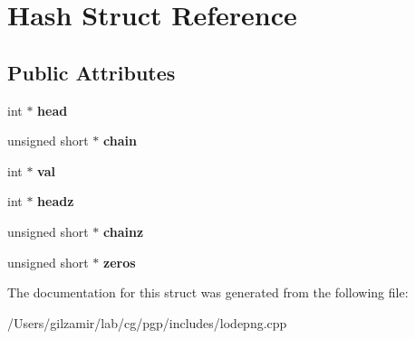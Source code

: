 \hypertarget{struct_hash}{}\section{Hash Struct Reference}
\label{struct_hash}
\subsection*{Public Attributes}
\begin{DoxyCompactItemize}
\item 
\mbox{\label{struct_hash_a0977cf12b1d8e6bbc784b5e0877926f5}} 
int $\ast$ {\bfseries head}
\item 
\mbox{\label{struct_hash_abf6ad3db2f652a19cc4ff0792e477899}} 
unsigned short $\ast$ {\bfseries chain}
\item 
\mbox{\label{struct_hash_a66918968854722efdf7ab5f8ac2c6c1d}} 
int $\ast$ {\bfseries val}
\item 
\mbox{\label{struct_hash_a3ed8f51297a858686e11a1a295a3a39c}} 
int $\ast$ {\bfseries headz}
\item 
\mbox{\label{struct_hash_a04ef237e7bc2fa99bc7305fb2352084d}} 
unsigned short $\ast$ {\bfseries chainz}
\item 
\mbox{\label{struct_hash_a7247caa3e23eaba8f0d199ec5010c931}} 
unsigned short $\ast$ {\bfseries zeros}
\end{DoxyCompactItemize}


The documentation for this struct was generated from the following file\+:\begin{DoxyCompactItemize}
\item 
/\+Users/gilzamir/lab/cg/pgp/includes/lodepng.\+cpp\end{DoxyCompactItemize}
